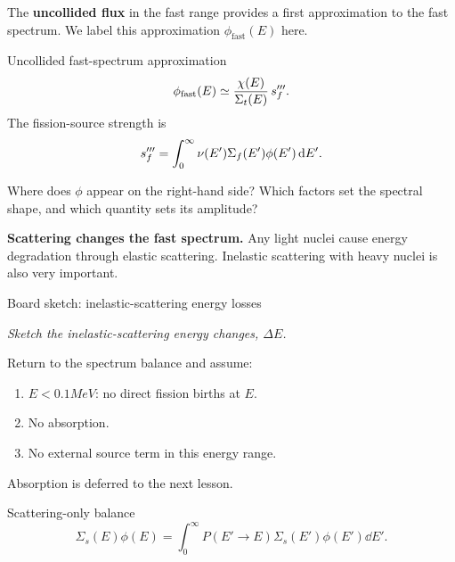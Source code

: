 \newpage

\begin{handoutcolumns}
The \textbf{uncollided flux} in the fast range provides a first
approximation to the fast spectrum. We label this approximation
$\phi_{\mathrm{fast}}(E)$ here.

\begin{fixedbox}{Uncollided fast-spectrum approximation}
$$
\phi_{\mathrm{fast}}(E)\simeq
\frac{\chi(E)}{\Sigma_t(E)}\,s_f^{\prime\prime\prime}.
$$
The fission-source strength is
$$
s_f^{\prime\prime\prime}=\int_0^\infty\nu(E')\Sigma_f(E')\phi(E')\,\mathrm{d} E'.
$$
\end{fixedbox}

\begin{checkpoint}
Where does $\phi$ appear on the right-hand side? Which factors set
the spectral shape, and which quantity sets its amplitude?
\end{checkpoint}

\textbf{Scattering changes the fast spectrum.}
Any light nuclei cause energy degradation through elastic scattering.
Inelastic scattering with heavy nuclei is also very important.

\begin{boardbox}{Board sketch: inelastic-scattering energy losses}
\begin{minipage}[t][0.65in][t]{\linewidth}
{\footnotesize\itshape Sketch the inelastic-scattering energy changes, $\Delta E$.}
\end{minipage}
\end{boardbox}

Return to the spectrum balance and assume:
\begin{enumerate}[leftmargin=1.55em,itemsep=1pt,topsep=2pt]
  \item $E<0.1\unit{MeV}$: no direct fission births at $E$.
  \item No absorption.
  \item No external source term in this energy range.
\end{enumerate}
Absorption is deferred to the next lesson.

\begin{fixedbox}{Scattering-only balance}
$$
\Sigma_s(E)\phi(E)=
\int_0^\infty P(E'\!\to\!E)\Sigma_s(E')\phi(E')\dd E'.
$$
\end{fixedbox}


\end{handoutcolumns}
